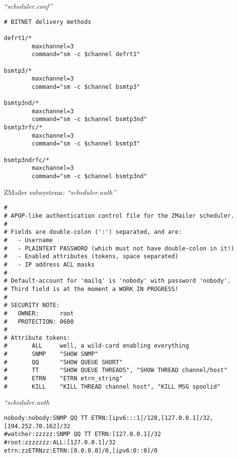 \documentclass[a4paper,landscape]{slides}
\newcommand{\ZM}{ZMailer}
\begin{document}
\begin{overlay}
\small
\centerline{{\it ``scheduler.conf''}}
\tiny
\begin{verbatim}
# BITNET delivery methods

defrt1/*
        maxchannel=3
        command="sm -c $channel defrt1"

bsmtp3/*
        maxchannel=3
        command="sm -c $channel bsmtp3"

bsmtp3nd/*
        maxchannel=3
        command="sm -c $channel bsmtp3nd"
bsmtp3rfc/*
        maxchannel=3
        command="sm -c $channel bsmtp3"

bsmtp3ndrfc/*
        maxchannel=3
        command="sm -c $channel bsmtp3nd"
\end{verbatim}
\vfill
\end{overlay}


\begin{overlay}

\centerline{\large \ZM{} subsystems: {\it ``scheduler.auth''}}
\tiny
\begin{verbatim}
#
# APOP-like authentication control file for the ZMailer scheduler.
#
# Fields are double-colon (':') separated, and are:
#   - Username
#   - PLAINTEXT PASSWORD (which must not have double-colon in it!)
#   - Enabled attributes (tokens, space separated)
#   - IP address ACL masks
#
# Default-account for 'mailq' is 'nobody' with password 'nobody'.
# Third field is at the moment a WORK IN PROGRESS!
#
# SECURITY NOTE:
#   OWNER:      root
#   PROTECTION: 0600
#
# Attribute tokens:
#       ALL     well, a wild-card enabling everything
#       SNMP    "SHOW SNMP"
#       QQ      "SHOW QUEUE SHORT"
#       TT      "SHOW QUEUE THREADS", "SHOW THREAD channel/host"
#       ETRN    "ETRN etrn_string"
#       KILL    "KILL THREAD channel host", "KILL MSG spoolid"
\end{verbatim}
\vfill
\end{overlay}
\begin{overlay}
\centerline{{\it ``scheduler.auth}}
\tiny
\begin{verbatim}
nobody:nobody:SNMP QQ TT ETRN:[ipv6:::1]/128,[127.0.0.1]/32,[194.252.70.162]/32
#watcher:zzzzz:SNMP QQ TT ETRN:[127.0.0.1]/32
#root:zzzzzzz:ALL:[127.0.0.1]/32
etrn:zzETRNzz:ETRN:[0.0.0.0]/0,[ipv6:0::0]/0
\end{verbatim}
\vfill
\end{overlay}
\end{document}
